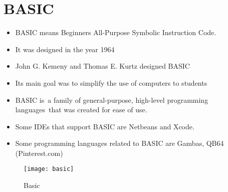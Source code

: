 \documentclass{article}
\begin{document}
	\section{BASIC}
	\begin{itemize}
		\item BASIC means Beginners All-Purpose Symbolic Instruction Code.
		\item It was  designed in the year 1964 
		\item John  G. Kemeny and Thomas E. Kurtz  designed BASIC 
		\item Its main goal  was to simplify the use of computers to students
		\item BASIC  is a family of general-purpose, high-level programming languages that was created  for  ease of use.
		\item Some IDEs that support BASIC are Netbeans and Xcode.
		\item Some programming languages related to BASIC are Gambas, QB64 
		(Pinterest.com)
	\end{itemize}

\begin{figure}[h]
	\texttt{[image: basic]}
	\caption{Basic}
	\label{fig:basic}
\end{figure}
\end{document}
